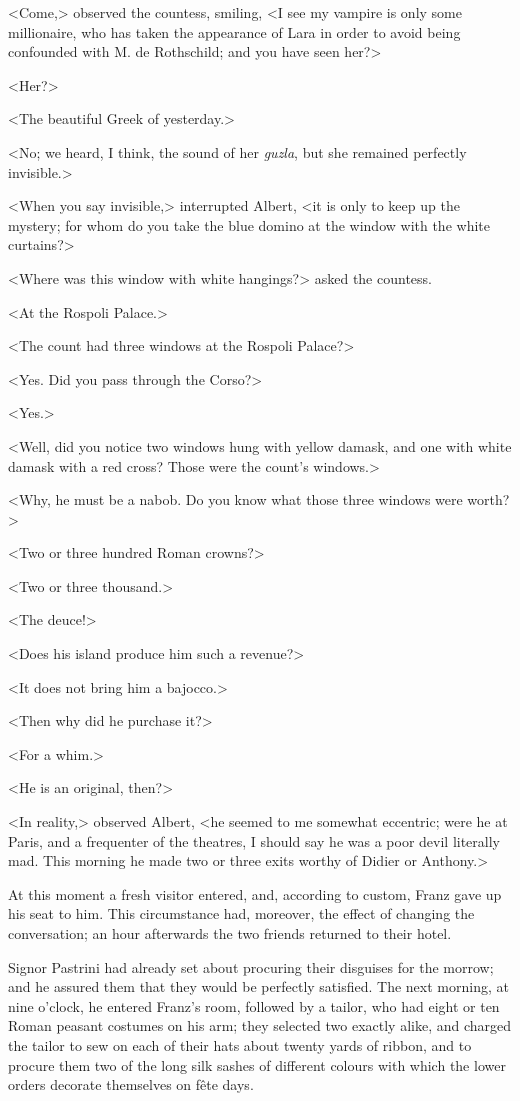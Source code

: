  <Come,> observed the countess, smiling, <I see my vampire is only some millionaire, who has taken the appearance of Lara in order to avoid being confounded with M. de Rothschild; and you have seen her?> 

 <Her?>

<The beautiful Greek of yesterday.> 

 <No; we heard, I think, the sound of her \textit{guzla}, but she remained perfectly invisible.> 

 <When you say invisible,> interrupted Albert, <it is only to keep up the mystery; for whom do you take the blue domino at the window with the white curtains?> 

 <Where was this window with white hangings?> asked the countess. 

 <At the Rospoli Palace.> 

 <The count had three windows at the Rospoli Palace?> 

 <Yes. Did you pass through the Corso?> 

 <Yes.> 

 <Well, did you notice two windows hung with yellow damask, and one with white damask with a red cross? Those were the count's windows.> 

 <Why, he must be a nabob. Do you know what those three windows were worth?> 

 <Two or three hundred Roman crowns?> 

 <Two or three thousand.> 

 <The deuce!> 

 <Does his island produce him such a revenue?> 

 <It does not bring him a bajocco.> 

 <Then why did he purchase it?> 

 <For a whim.> 

 <He is an original, then?> 

 <In reality,> observed Albert, <he seemed to me somewhat eccentric; were he at Paris, and a frequenter of the theatres, I should say he was a poor devil literally mad. This morning he made two or three exits worthy of Didier or Anthony.> 

 At this moment a fresh visitor entered, and, according to custom, Franz gave up his seat to him. This circumstance had, moreover, the effect of changing the conversation; an hour afterwards the two friends returned to their hotel. 

 Signor Pastrini had already set about procuring their disguises for the morrow; and he assured them that they would be perfectly satisfied. The next morning, at nine o'clock, he entered Franz's room, followed by a tailor, who had eight or ten Roman peasant costumes on his arm; they selected two exactly alike, and charged the tailor to sew on each of their hats about twenty yards of ribbon, and to procure them two of the long silk sashes of different colours with which the lower orders decorate themselves on fête days. 

